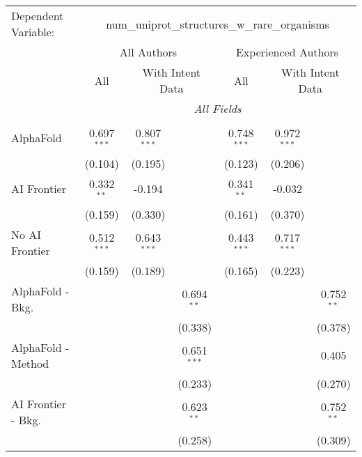 \begingroup
\centering
\begin{tabular}{lcccccc}
   \tabularnewline \midrule \midrule
   Dependent Variable: & \multicolumn{6}{c}{num\_uniprot\_structures\_w\_rare\_organisms}\\
 & \multicolumn{3}{c}{All Authors} & \multicolumn{3}{c}{Experienced Authors} \\
\cmidrule(lr){2-4} \cmidrule(lr){5-7}
 & \multicolumn{1}{c}{All} & \multicolumn{2}{c}{With Intent Data} & \multicolumn{1}{c}{All} & \multicolumn{2}{c}{With Intent Data} \\
\cmidrule(lr){2-2} \cmidrule(lr){3-4} \cmidrule(lr){5-5} \cmidrule(lr){6-7}
 & \multicolumn{6}{c}{\textit{All Fields}} \\ \\
   AlphaFold               & 0.697$^{***}$ & 0.807$^{***}$ &               & 0.748$^{***}$ & 0.972$^{***}$ &   \\   
                           & (0.104)       & (0.195)       &               & (0.123)       & (0.206)       &   \\   
   AI Frontier             & 0.332$^{**}$  & -0.194        &               & 0.341$^{**}$  & -0.032        &   \\   
                           & (0.159)       & (0.330)       &               & (0.161)       & (0.370)       &   \\   
   No AI Frontier          & 0.512$^{***}$ & 0.643$^{***}$ &               & 0.443$^{***}$ & 0.717$^{***}$ &   \\   
                           & (0.159)       & (0.189)       &               & (0.165)       & (0.223)       &   \\   
   AlphaFold - Bkg.        &               &               & 0.694$^{**}$  &               &               & 0.752$^{**}$\\   
                           &               &               & (0.338)       &               &               & (0.378)\\   
   AlphaFold - Method      &               &               & 0.651$^{***}$ &               &               & 0.405\\   
                           &               &               & (0.233)       &               &               & (0.270)\\   
   AI Frontier - Bkg.      &               &               & 0.623$^{**}$  &               &               & 0.752$^{**}$\\   
                           &               &               & (0.258)       &               &               & (0.309)\\   

\end{tabular}
